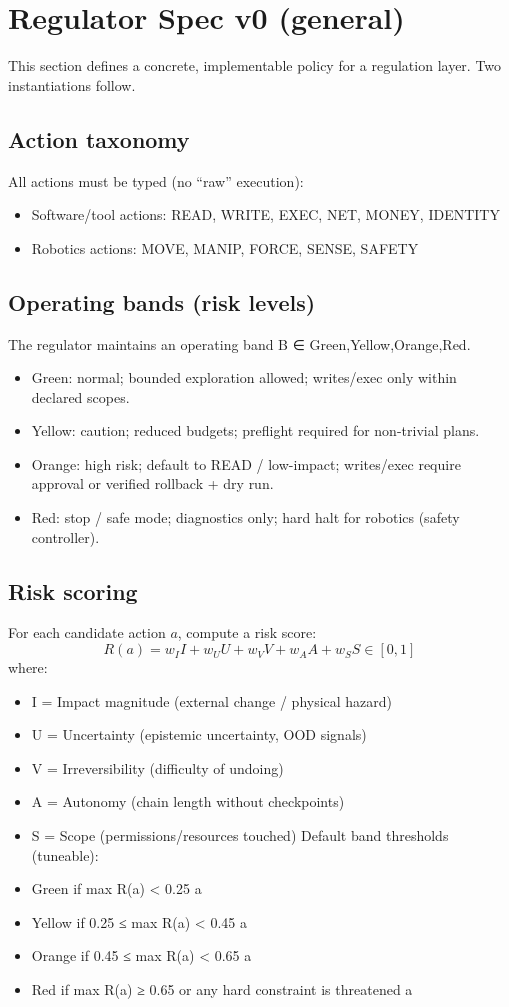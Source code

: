 \documentclass[11pt]{article}
\begin{document}
\section{Regulator Spec v0 (general)}
This section defines a concrete, implementable policy for a regulation layer. Two instantiations
follow.
\subsection{Action taxonomy}
All actions must be typed (no “raw” execution):
\begin{itemize}
\item 
Software/tool actions: READ, WRITE, EXEC, NET, MONEY, IDENTITY
\item 
Robotics actions: MOVE, MANIP, FORCE, SENSE, SAFETY
\end{itemize}
\subsection{Operating bands (risk levels)}
The regulator maintains an operating band B ∈ {Green,Yellow,Orange,Red}.
\begin{itemize}
\item 
Green: normal; bounded exploration allowed; writes/exec only within declared scopes.
\item 
Yellow: caution; reduced budgets; preflight required for non-trivial plans.
\item 
Orange: high risk; default to READ / low-impact; writes/exec require approval or verified
rollback + dry run.
\item 
Red: stop / safe mode; diagnostics only; hard halt for robotics (safety controller).
\end{itemize}
\subsection{Risk scoring}
For each candidate action $a$, compute a risk score:
\begin{equation}
R(a) = w_I I + w_U U + w_V V + w_A A + w_S S \in [0,1]
\end{equation}
where:
\begin{itemize}
\item 
I = Impact magnitude (external change / physical hazard)
\item 
U = Uncertainty (epistemic uncertainty, OOD signals)
\item 
V = Irreversibility (difficulty of undoing)
\item 
A = Autonomy (chain length without checkpoints)
\item 
S = Scope (permissions/resources touched)
Default band thresholds (tuneable):
\item 
Green if max R(a) < 0.25
a
\item 
Yellow if 0.25 ≤ max R(a) < 0.45
a
\item 
Orange if 0.45 ≤ max R(a) < 0.65
a
\item 
Red if max R(a) ≥ 0.65 or any hard constraint is threatened
a
\end{itemize}
\end{document}
